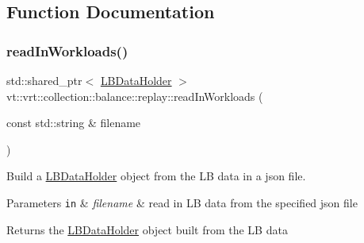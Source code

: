 \subsection{Function Documentation}
\mbox{\label{namespacevt_1_1vrt_1_1collection_1_1balance_1_1replay_a2177c340e50c514aa567bde597a58139}} 
\subsubsection{\texorpdfstring{read\+In\+Workloads()}{readInWorkloads()}}
{\footnotesize\ttfamily std\+::shared\+\_\+ptr$<$ \hyperlink{structvt_1_1vrt_1_1collection_1_1balance_1_1_l_b_data_holder}{L\+B\+Data\+Holder} $>$ vt\+::vrt\+::collection\+::balance\+::replay\+::read\+In\+Workloads (\begin{DoxyParamCaption}\item[{const std\+::string \&}]{filename }\end{DoxyParamCaption})}



Build a \hyperlink{structvt_1_1vrt_1_1collection_1_1balance_1_1_l_b_data_holder}{L\+B\+Data\+Holder} object from the LB data in a json file. 


\begin{DoxyParams}[1]{Parameters}
\mbox{\tt in}  & {\em filename} & read in LB data from the specified json file\\
\hline
\end{DoxyParams}
\begin{DoxyReturn}{Returns}
the \hyperlink{structvt_1_1vrt_1_1collection_1_1balance_1_1_l_b_data_holder}{L\+B\+Data\+Holder} object built from the LB data 
\end{DoxyReturn}
\mbox{\label{namespacevt_1_1vrt_1_1collection_1_1balance_1_1replay_ae08097ad160d549bdb41f410d932ca85}} 
